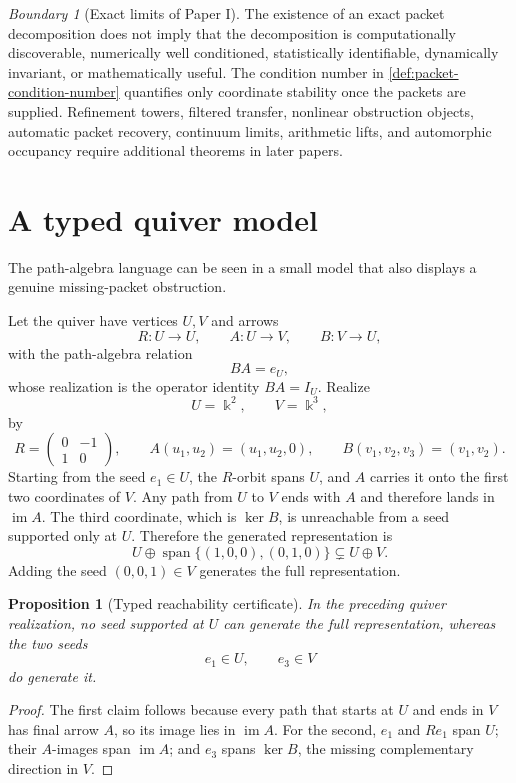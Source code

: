 \documentclass[11pt]{article}
\newtheorem{proposition}[proposition]{Proposition}
\theoremstyle{definition}
\theoremstyle{remark}
\newtheorem{boundary}[boundary]{Boundary}
\theoremstyle{definition}\newtheorem{example}[theorem]{Example}
\newcommand{\bbk}{\Bbbk}
\newcommand{\im}{\operatorname{im}}
\newcommand{\Span}{\operatorname{span}}
\newcommand{\RecordID}[1]{\label{record:#1}}
\begin{document}
\begin{boundary}[Exact limits of Paper I]
\label{bnd:final-claim-boundary}
The existence of an exact packet decomposition does not imply that the decomposition is computationally discoverable, numerically well conditioned, statistically identifiable, dynamically invariant, or mathematically useful.  The condition number in \cref{def:packet-condition-number} quantifies only coordinate stability once the packets are supplied.  Refinement towers, filtered transfer, nonlinear obstruction objects, automatic packet recovery, continuum limits, arithmetic lifts, and automorphic occupancy require additional theorems in later papers.
\end{boundary}
\RecordID{PSC-I-B-FINAL-CLAIM-BOUNDARY}



\section{A typed quiver model}

The path-algebra language can be seen in a small model that also displays a genuine missing-packet obstruction.

Let the quiver have vertices $U,V$ and arrows
\[
R:U\to U,
\qquad
A:U\to V,
\qquad
B:V\to U,
\]
with the path-algebra relation
\[
BA=e_U,
\]
whose realization is the operator identity $BA=I_U$.
Realize
\[
U=\bbk^2,
\qquad
V=\bbk^3,
\]
by
\[
R=
\begin{pmatrix}0&-1\\1&0\end{pmatrix},
\qquad
A(u_1,u_2)=(u_1,u_2,0),
\qquad
B(v_1,v_2,v_3)=(v_1,v_2).
\]
Starting from the seed $e_1\in U$, the $R$-orbit spans $U$, and $A$ carries it onto the first two coordinates of $V$. Any path from $U$ to $V$ ends with $A$ and therefore lands in $\im A$. The third coordinate, which is $\ker B$, is unreachable from a seed supported only at $U$. Therefore the generated representation is
\[
U\oplus\Span\{(1,0,0),(0,1,0)\}
\subsetneq U\oplus V.
\]
Adding the seed $(0,0,1)\in V$ generates the full representation.

\begin{proposition}[Typed reachability certificate]
\label{prop:typed-reachability}
In the preceding quiver realization, no seed supported at $U$ can generate the full representation, whereas the two seeds
\[
e_1\in U,
\qquad
e_3\in V
\]
do generate it.
\end{proposition}

\begin{proof}
The first claim follows because every path that starts at $U$ and ends in $V$ has final arrow $A$, so its image lies in $\im A$. For the second, $e_1$ and $Re_1$ span $U$; their $A$-images span $\im A$; and $e_3$ spans $\ker B$, the missing complementary direction in $V$.
\end{proof}
\end{document}
